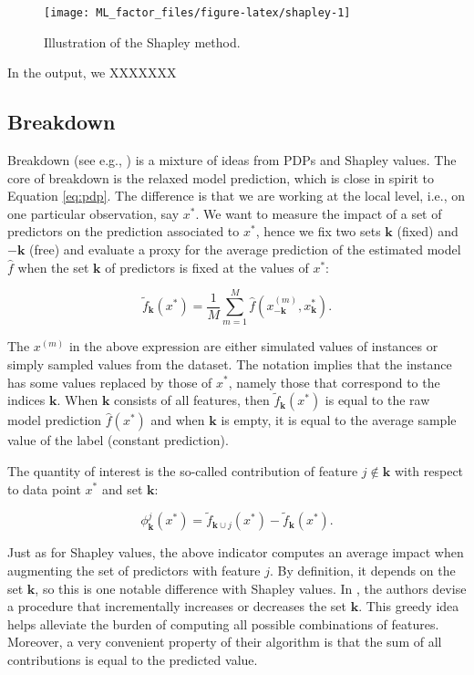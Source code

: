 \documentclass[]{krantz}
\theoremstyle{definition}
\theoremstyle{definition}
\theoremstyle{definition}
\theoremstyle{remark}
\begin{document}
\begin{figure}[b]
\texttt{[image: ML\_factor\_files/figure-latex/shapley-1]} \caption{Illustration of the Shapley method.}\label{fig:shapley}
\end{figure}

\normalsize

In the output, we XXXXXXX

\hypertarget{breakdown}{%
\subsection{Breakdown}\label{breakdown}}

Breakdown (see e.g., \citet{staniak2018explanations}) is a mixture of
ideas from PDPs and Shapley values. The core of breakdown is the relaxed
model prediction, which is close in spirit to Equation \eqref{eq:pdp}. The
difference is that we are working at the local level, i.e., on one
particular observation, say \(x^*\). We want to measure the impact of a
set of predictors on the prediction associated to \(x^*\), hence we fix
two sets \(\textbf{k}\) (fixed) and \(-\textbf{k}\) (free) and evaluate
a proxy for the average prediction of the estimated model \(\hat{f}\)
when the set \(\textbf{k}\) of predictors is fixed at the values of
\(x^*\):

\[\tilde{f}_{\textbf{k}}(x^*)=\frac{1}{M}\sum_{m=1}^M \hat{f}\left(x^{(m)}_{-\textbf{k}},x^*_{\textbf{k}} \right).\]

The \(x^{(m)}\) in the above expression are either simulated values of
instances or simply sampled values from the dataset. The notation
implies that the instance has some values replaced by those of \(x^*\),
namely those that correspond to the indices \(\textbf{k}\). When
\(\textbf{k}\) consists of all features, then
\(\tilde{f}_{\textbf{k}}(x^*)\) is equal to the raw model prediction
\(\hat{f}(x^*)\) and when \(\textbf{k}\) is empty, it is equal to the
average sample value of the label (constant prediction).

The quantity of interest is the so-called contribution of feature
\(j\notin \textbf{k}\) with respect to data point \(x^*\) and set
\(\textbf{k}\):

\[\phi_{\textbf{k}}^j(x^*)=\tilde{f}_{\textbf{k} \cup j}(x^*)-\tilde{f}_{\textbf{k}}(x^*).\]

Just as for Shapley values, the above indicator computes an average
impact when augmenting the set of predictors with feature \(j\). By
definition, it depends on the set \(\textbf{k}\), so this is one notable
difference with Shapley values. In \citet{staniak2018explanations}, the
authors devise a procedure that incrementally increases or decreases the
set \(\textbf{k}\). This greedy idea helps alleviate the burden of
computing all possible combinations of features. Moreover, a very
convenient property of their algorithm is that the sum of all
contributions is equal to the predicted value.
\end{document}
